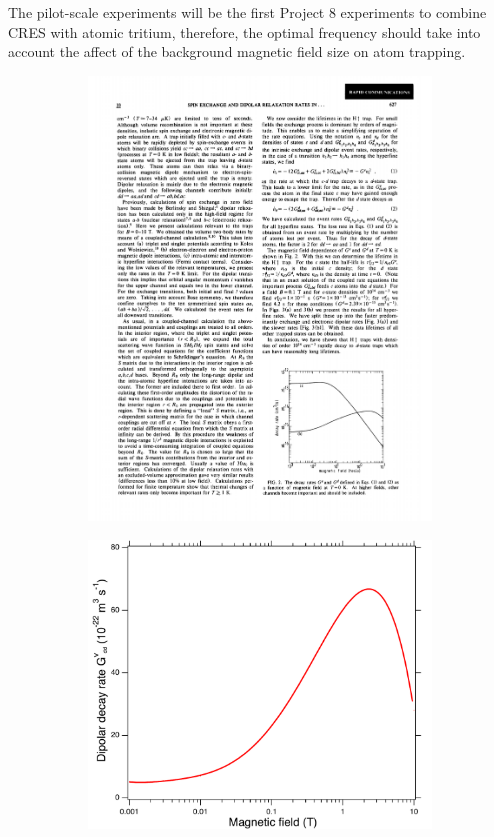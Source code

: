 The pilot-scale experiments will be the first Project 8 experiments to combine CRES with atomic tritium, therefore, the optimal frequency should take into account the affect of the background magnetic field size on atom trapping.
\begin{figure}[htbp]
    \centering
    \begin{subfigure}{0.46\textwidth}
        \includegraphics*[width=\textwidth]{figs/Chapter-3/gloss.pdf}
        \caption{}
    \end{subfigure}
    \hfill
    \begin{subfigure}{0.49\textwidth}
        \includegraphics*[width=\textwidth]{figs/Chapter-3/dipolarloss.pdf}

\end{subfigure}
\end{figure}

